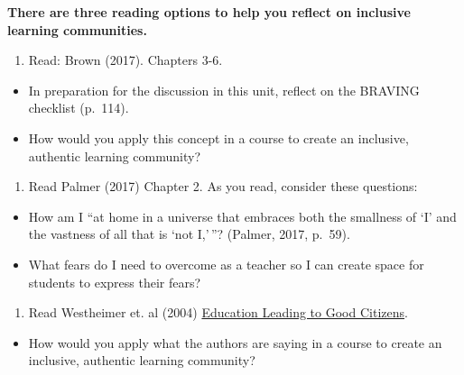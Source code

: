 \documentclass[
]{book}
\providecommand{\tightlist}{%
  \setlength{\itemsep}{0pt}\setlength{\parskip}{0pt}}
\begin{document}
\begin{reflect}
\textbf{There are three reading options to help you reflect on inclusive
learning communities.}

\begin{enumerate}
\def\labelenumi{\arabic{enumi}.}
\tightlist
\item
  Read: Brown (2017). Chapters 3-6.\\
\end{enumerate}

\begin{itemize}
\tightlist
\item
  In preparation for the discussion in this unit, reflect on the BRAVING
  checklist (p.~114).\\
\item
  How would you apply this concept in a course to create an inclusive,
  authentic learning community?\\
\end{itemize}

\begin{enumerate}
\def\labelenumi{\arabic{enumi}.}
\setcounter{enumi}{1}
\tightlist
\item
  Read Palmer (2017) Chapter 2. As you read, consider these questions:\\
\end{enumerate}

\begin{itemize}
\tightlist
\item
  How am I ``at home in a universe that embraces both the smallness of
  `I' and the vastness of all that is `not I,'\,''? (Palmer, 2017,
  p.~59).\\
\item
  What fears do I need to overcome as a teacher so I can create space
  for students to express their fears?\\
\end{itemize}

\begin{enumerate}
\def\labelenumi{\arabic{enumi}.}
\setcounter{enumi}{2}
\tightlist
\item
  Read Westheimer et. al (2004)
  \href{assets/unit3/Westheimer.pdf}{Education Leading to Good
  Citizens}.\\
\end{enumerate}

\begin{itemize}
\tightlist
\item
  How would you apply what the authors are saying in a course to create
  an inclusive, authentic learning community?
\end{itemize}
\end{reflect}
\end{document}
